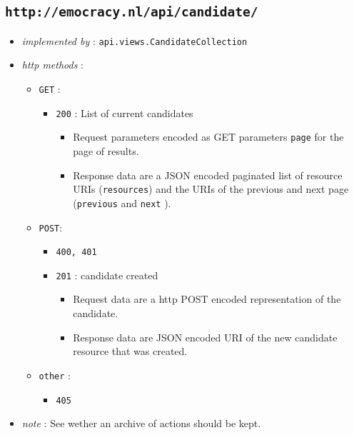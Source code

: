 \documentclass[a4paper]{report}
\begin{document}
\subsection{\texttt{http://emocracy.nl/api/candidate/}}
\begin{itemize}
    \item{\textsl{implemented by} : \texttt{api.views.CandidateCollection}}
    \item{\textsl{http methods} :
        \begin{itemize}
            \item{\texttt{GET} :
                \begin{itemize}
                    \item{\texttt{200} : List of current candidates
                    \begin{itemize}
                        \item{Request parameters encoded as GET parameters 
                        \texttt{page} for the page of results.}
                        \item{Response data are a JSON encoded paginated list of 
                        resource URIs (\texttt{resources}) and the URIs of the 
                        previous and next page (\texttt{previous} and \texttt{next}
                        ).}
                    \end{itemize}
                    }
                \end{itemize}
            }
            \item{\texttt{POST}:
                \begin{itemize}
                    \item{\texttt{400, 401}}
                    \item{\texttt{201} : candidate created
                    \begin{itemize}
                        \item{Request data are a http POST encoded representation
                        of the candidate.}
                        \item{Response data are JSON encoded URI of the new
                        candidate resource that was created.}
                    \end{itemize}
                    }
                \end{itemize}
            }
            
            \item{\texttt{other} :
                \begin{itemize}
                    \item{\texttt{405}}
                \end{itemize}
            }
        \end{itemize}
    }
    \item{\textsl{note} : See wether an archive of actions should be kept.}    
\end{itemize}
\end{document}
